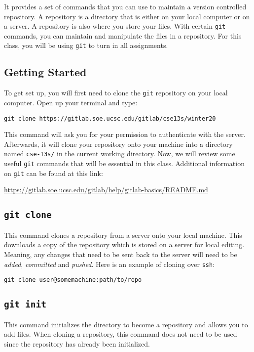 \documentclass[11pt]{article}
\begin{document}
It provides a set of commands that you can use to maintain a version
controlled repository. A repository is a directory that is either on
your local computer or on a server. A repository is also where you
store your files. With certain \texttt{git} commands, you can
maintain and manipulate the files in a repository. For this class,
you will be using \texttt{git} to turn in all assignments.

\subsection{Getting Started}
To get set up, you will first need to clone the \texttt{git} repository on your local computer. Open up your terminal and type:
\begin{lstlisting}
git clone https://gitlab.soe.ucsc.edu/gitlab/cse13s/winter20
\end{lstlisting}

This command will ask you for your permission to authenticate with
the server. Afterwards, it will clone your repository onto your
machine into a directory named \texttt{cse-13s/} in the current working
directory. Now, we will review some useful \texttt{git} commands
that will be essential in this class. Additional information on
\texttt{git} can be found at this link:

\centerline{\url{https://gitlab.soe.ucsc.edu/gitlab/help/gitlab-basics/README.md}}

\subsection{\texttt{git clone}}
This command clones a repository from a server onto your local machine. This
downloads a copy of the repository which is stored on a server for local
editing. Meaning, any changes that need to be sent back to the server will need
to be \emph{added}, \emph{committed} and \emph{pushed}. Here is an example of
cloning over \texttt{ssh}:
\begin{lstlisting}
git clone user@somemachine:path/to/repo
\end{lstlisting}

\subsection{\texttt{git init}}
This command initializes the directory to become a repository and allows you to add files. When cloning a repository, this command does not need to be used since the repository has already been initialized.
\end{document}
